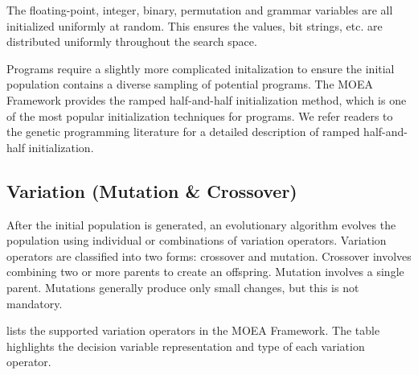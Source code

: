The floating-point, integer, binary, permutation and grammar variables are all initialized uniformly at random.  This ensures the values, bit strings, etc. are distributed uniformly throughout the search space.

Programs require a slightly more complicated initalization to ensure the initial population contains a diverse sampling of potential programs.  The MOEA Framework provides the ramped half-and-half initialization method, which is one of the most popular initialization techniques for programs.  We refer readers to the genetic programming literature for a detailed description of ramped half-and-half initialization.

\subsection{Variation (Mutation \& Crossover)}
After the initial population is generated, an evolutionary algorithm evolves the population using individual or combinations of variation operators.  Variation operators are classified into two forms: crossover and mutation.  Crossover involves combining two or more parents to create an offspring.  Mutation involves a single parent.  Mutations generally produce only small changes, but this is not mandatory.

 lists the supported variation operators in the MOEA Framework.  The table highlights the decision variable representation and type of each variation operator.

